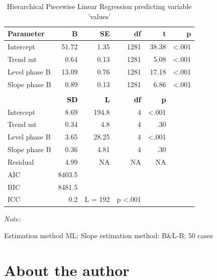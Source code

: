 \documentclass[
]{book}
\begin{document}
\begin{table}

\caption{\label{tab:unnamed-chunk-68}Hierarchical Piecewise Linear Regression predicting variable 'values'}
\centering
\begin{threeparttable}
\begin{tabular}[t]{lrrrrr}
\toprule
Parameter & B & SE & df & t & p\\
\midrule
Intercept & 51.72 & 1.35 & 1281 & 38.38 & <.001\\
Trend mt & 0.64 & 0.13 & 1281 & 5.08 & <.001\\
Level phase B & 13.09 & 0.76 & 1281 & 17.18 & <.001\\
Slope phase B & 0.89 & 0.13 & 1281 & 6.86 & <.001\\
\midrule
\addlinespace[0.3em]
\multicolumn{6}{l}{\textbf{Random effects}}\\
\textcolor{black}{\textbf{\hspace{1em}}} & \textcolor{black}{\textbf{SD}} & \textcolor{black}{\textbf{L}} & \textcolor{black}{\textbf{df}} & \textcolor{black}{\textbf{p}} & \textcolor{black}{\textbf{}}\\
\hspace{1em}Intercept & 8.69 & 194.8 & 4 & <.001 & \\
\hspace{1em}Trend mt & 0.34 & 4.8 & 4 & .30 & \\
\hspace{1em}Level phase B & 3.65 & 28.25 & 4 & <.001 & \\
\hspace{1em}Slope phase B & 0.36 & 4.81 & 4 & .30 & \\
\hspace{1em}Residual & 4.99 & NA & NA & NA & \\
\midrule
AIC & 8403.5 &  &  &  & \\
BIC & 8481.5 &  &  &  & \\
ICC & 0.2 & L = 192 & p <.001 &  & \\
\bottomrule
\end{tabular}
\begin{tablenotes}
\item \textit{Note: } 
\item Estimation method ML; Slope estimation method: B\&L-B; 50 cases
\end{tablenotes}
\end{threeparttable}
\end{table}

\hypertarget{about-the-author}{%
\chapter*{About the author}\label{about-the-author}}
\end{document}
